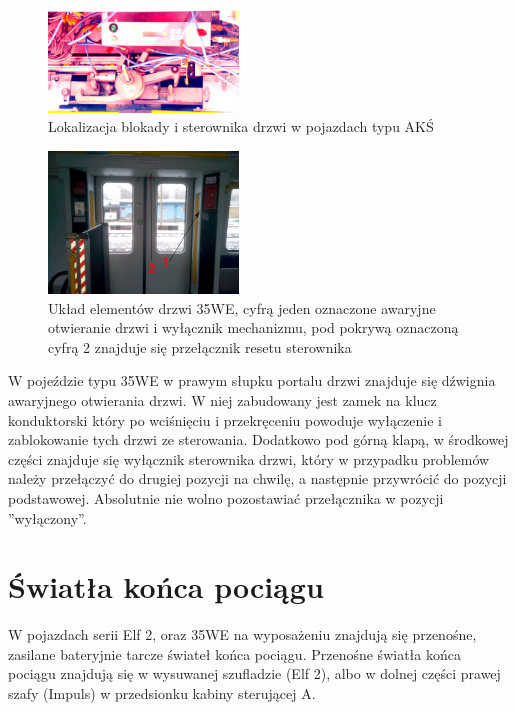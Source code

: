 \begin{figure}
	\includegraphics[width=0.45\textwidth]{skryptkierownik-img/skryptkierownik-img059.jpg}
	\caption{Lokalizacja blokady i sterownika drzwi w pojazdach typu AKŚ}
\end{figure}
\begin{figure}
	\includegraphics[width=0.45\textwidth]{skryptkierownik-img/35we-drzwi.png}
	\caption{Układ elementów drzwi 35WE, cyfrą jeden oznaczone awaryjne otwieranie drzwi i wyłącznik mechanizmu, pod pokrywą oznaczoną cyfrą 2 znajduje się przełącznik resetu sterownika}
\end{figure}

W pojeździe typu 35WE w prawym słupku portalu drzwi znajduje się dźwignia awaryjnego otwierania drzwi. W niej zabudowany jest zamek na klucz konduktorski który po wciśnięciu i przekręceniu powoduje wyłączenie i zablokowanie tych drzwi ze sterowania. Dodatkowo pod górną klapą, w środkowej części znajduje się wyłącznik sterownika drzwi, który w przypadku problemów należy przełączyć do drugiej pozycji na chwilę, a następnie przywrócić do pozycji podstawowej. Absolutnie nie wolno pozostawiać przełącznika w pozycji ''wyłączony''. 

\section{Światła końca pociągu}

W pojazdach serii Elf 2, oraz 35WE na wyposażeniu znajdują się przenośne, zasilane bateryjnie tarcze świateł końca pociągu. Przenośne światła końca pociągu znajdują się w wysuwanej szufladzie (Elf 2), albo w dolnej części prawej szafy (Impuls) w przedsionku kabiny sterującej A.

